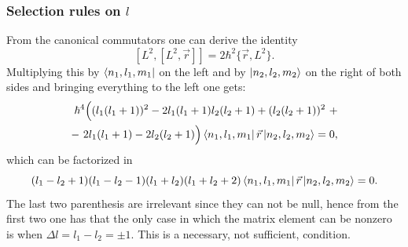 \subsubsection{Selection rules on $l$}
From the canonical commutators one can derive the identity
\begin{equation*}
    \left[L^2,\left[L^2, \vec{r}\right]\right]=2\hbar^2 \bigl\{\vec{r}, L^2\bigr\}.
\end{equation*}
Multiplying this by $\bra{n_1,l_1,m_1}$ on the left and by $\ket{n_2,l_2,m_2}$ on the right of both sides and bringing everything to the left one gets:
\begin{align*}
    \hbar^4\Bigl((l_1(l_1+1))^2-2l_1(l_1+1)l_2(l_2+1)+(l_2(l_2+1))^2~+\\ 
    -~2l_1(l_1+1)-2l_2(l_2+1)\Bigr)\bra{n_1,l_1,m_1}\Vec{r}\ket{n_2,l_2,m_2} = 0,
\end{align*}
which can be factorized in
\begin{equation*}
    (l_1-l_2+1)(l_1-l_2-1)(l_1+l_2)(l_1+l_2+2)\bra{n_1,l_1,m_1}\Vec{r}\ket{n_2,l_2,m_2} = 0.
\end{equation*}
The last two parenthesis are irrelevant since they can not be null, hence from the first two one has that the only case in which the matrix element can be nonzero is when $\Delta l= l_1 - l_2 =\pm1$. This is a necessary, not sufficient, condition.

